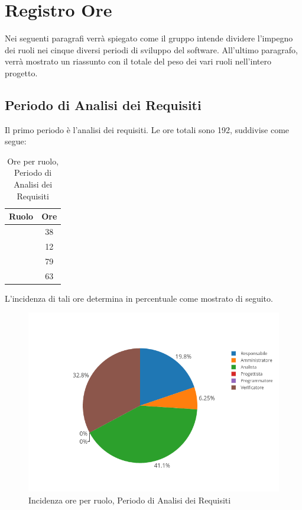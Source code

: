 \newpage

\section{Registro Ore}
Nei seguenti paragrafi verrà spiegato come il gruppo intende dividere l'impegno dei ruoli nei cinque diversi periodi di sviluppo del software. All'ultimo paragrafo, verrà mostrato un riassunto con il totale del peso dei vari ruoli nell'intero progetto.

\subsection{Periodo di Analisi dei Requisiti}
Il primo periodo è l'analisi dei requisiti. Le ore totali sono 192, suddivise come segue:

\begin{table}[H]
	\begin{center}
		\begin{tabular}{|c|c|}
			\hline
			\textbf{Ruolo}	& \textbf{Ore} \\
			\hline
			\Res	&	38	\\
			\hline
			\Amm	&	12	\\
			\hline
			\Ana	&	79	\\
			\hline
			\Ver	&	63	\\
			\hline
		\end{tabular}
	\end{center}
	\caption{Ore per ruolo, Periodo di Analisi dei Requisiti}
\end{table}

L'incidenza di tali ore determina in percentuale come mostrato di seguito.
\begin{figure}[H]
	\centering
	\includegraphics[scale=0.6]{img/AnalisiRequisiiti.png}
	\caption{Incidenza ore per ruolo, Periodo di Analisi dei Requisiti}
\end{figure}

